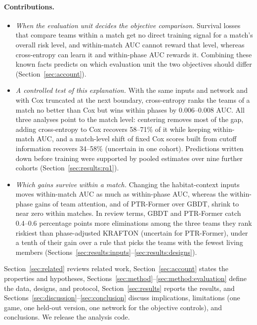 \documentclass[sigconf,anonymous]{acmart}
\begin{document}
\paragraph{Contributions.}
\begin{itemize}
\item \emph{When the evaluation unit decides the objective comparison.} Survival losses that compare teams within a match get no direct training signal for a match's overall risk level, and within-match AUC cannot reward that level, whereas cross-entropy can learn it and within-phase AUC rewards it. Combining these known facts predicts on which evaluation unit the two objectives should differ (Section~\ref{sec:account}).
\item \emph{A controlled test of this explanation.} With the same inputs and network and with Cox truncated at the next boundary, cross-entropy ranks the teams of a match no better than Cox but wins within phases by 0.006--0.008 AUC. All three analyses point to the match level: centering removes most of the gap, adding cross-entropy to Cox recovers 58--71\% of it while keeping within-match AUC, and a match-level shift of fixed Cox scores built from cutoff information recovers 34--58\% (uncertain in one cohort). Predictions written down before training were supported by pooled estimates over nine further cohorts (Section~\ref{sec:results:rq1}).
\item \emph{Which gains survive within a match.} Changing the habitat-context inputs moves within-match AUC as much as within-phase AUC, whereas the within-phase gains of team attention, and of PTR-Former over GBDT, shrink to near zero within matches. In review terms, GBDT and PTR-Former catch 0.4--0.6 percentage points more eliminations among the three teams they rank riskiest than phase-adjusted KRAFTON (uncertain for PTR-Former), under a tenth of their gain over a rule that picks the teams with the fewest living members (Sections~\ref{sec:results:inputs}--\ref{sec:results:designs}).
\end{itemize}
Section~\ref{sec:related} reviews related work, Section~\ref{sec:account} states the properties and hypotheses, Sections~\ref{sec:method}--\ref{sec:method:evaluation} define the data, designs, and protocol, Section~\ref{sec:results} reports the results, and Sections~\ref{sec:discussion}--\ref{sec:conclusion} discuss implications, limitations (one game, one held-out version, one network for the objective controls), and conclusions. We release the analysis code.

\end{document}
